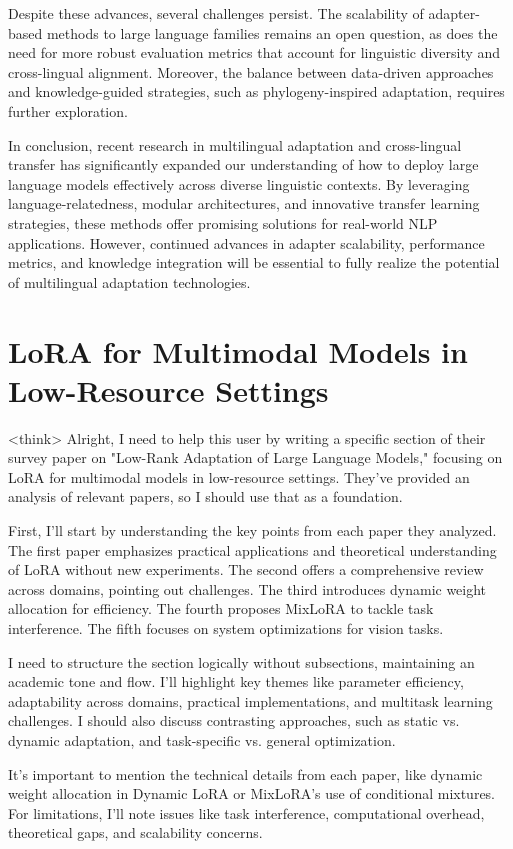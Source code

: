 \documentclass[conference]{IEEEtran}
\begin{document}
Despite these advances, several challenges persist. The scalability of adapter-based methods to large language families remains an open question, as does the need for more robust evaluation metrics that account for linguistic diversity and cross-lingual alignment. Moreover, the balance between data-driven approaches and knowledge-guided strategies, such as phylogeny-inspired adaptation, requires further exploration.

In conclusion, recent research in multilingual adaptation and cross-lingual transfer has significantly expanded our understanding of how to deploy large language models effectively across diverse linguistic contexts. By leveraging language-relatedness, modular architectures, and innovative transfer learning strategies, these methods offer promising solutions for real-world NLP applications. However, continued advances in adapter scalability, performance metrics, and knowledge integration will be essential to fully realize the potential of multilingual adaptation technologies.

\section{LoRA for Multimodal Models in Low-Resource Settings}
<think>
Alright, I need to help this user by writing a specific section of their survey paper on "Low-Rank Adaptation of Large Language Models," focusing on LoRA for multimodal models in low-resource settings. They've provided an analysis of relevant papers, so I should use that as a foundation.

First, I'll start by understanding the key points from each paper they analyzed. The first paper emphasizes practical applications and theoretical understanding of LoRA without new experiments. The second offers a comprehensive review across domains, pointing out challenges. The third introduces dynamic weight allocation for efficiency. The fourth proposes MixLoRA to tackle task interference. The fifth focuses on system optimizations for vision tasks.

I need to structure the section logically without subsections, maintaining an academic tone and flow. I'll highlight key themes like parameter efficiency, adaptability across domains, practical implementations, and multitask learning challenges. I should also discuss contrasting approaches, such as static vs. dynamic adaptation, and task-specific vs. general optimization.

It's important to mention the technical details from each paper, like dynamic weight allocation in Dynamic LoRA or MixLoRA's use of conditional mixtures. For limitations, I'll note issues like task interference, computational overhead, theoretical gaps, and scalability concerns.
\end{document}
